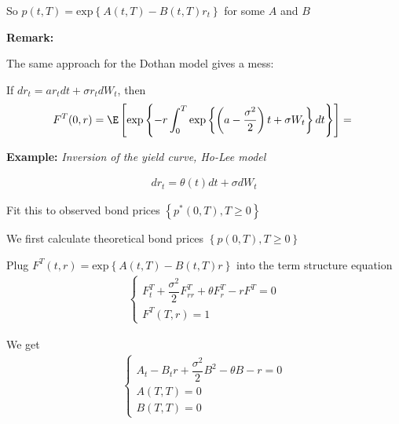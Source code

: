 \noindent So $p(t,T) =\text{exp}\left\{A(t,T)-B(t,T)r_t\right\}$ for some $A$ and $B$
\par\bigskip
\noindent\textbf{Remark:}\par
\noindent The same approach for the Dothan model gives a mess:\par
\noindent If $dr_t = ar_tdt+\sigma r_tdW_t$, then 
\begin{equation*}
  \begin{gathered}
    F^T(0,r) = \E\left[\text{exp}\left\{-r\int_{0}^{T}\text{exp}\left\{\left(a-\dfrac{\sigma^2}{2}\right)t+\sigma W_t\right\}dt\right\}\right]=\
  \end{gathered}
\end{equation*}
\par\bigskip
\noindent\textbf{Example:} \textit{Inversion of the yield curve, Ho-Lee model}\par
\begin{equation*}
  \begin{gathered}
    dr_t =\theta(t)dt+\sigma dW_t
  \end{gathered}
\end{equation*}\par
\noindent Fit this to observed bond prices $\left\{p^*(0,T),T\geq0\right\}$
\par\bigskip
\noindent We first calculate theoretical bond prices $\left\{p(0,T),T\geq0\right\}$\par
\noindent Plug $F^T(t,r) =\text{exp}\left\{A(t,T)-B(t,T)r\right\}$ into the term structure equation
\begin{equation*}
  \begin{gathered}
    \begin{cases}
      F_t^T+\dfrac{\sigma^2}{2}F_{rr}^T+\theta F_r^T-rF^T=0\\
      F^T(T,r)=1
    \end{cases}
  \end{gathered}
\end{equation*}\par
\noindent We get
\begin{equation*}
  \begin{gathered}
    \begin{cases}
      A_t-B_tr+\dfrac{\sigma^2}{2}B^2-\theta B-r=0\\
      A(T,T) =0\\
      B(T,T) =0
    \end{cases}
  \end{gathered}
\end{equation*}\par
